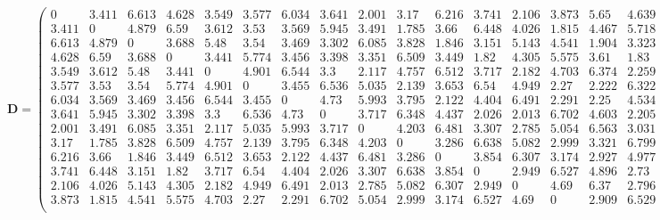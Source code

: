 \documentclass[11pt,oneside,czech,american]{book} %
\theoremstyle{definition} %
\theoremstyle{definition}
\begin{document}
\tiny
$$\bm{D}=\begin{pmatrix}
	0 & 3.411 & 6.613 & 4.628 & 3.549 & 3.577 & 6.034 & 3.641 & 2.001 & 3.17 & 6.216 & 3.741 & 2.106 & 3.873 & 5.65 & 4.639 & 3.327 & 2.033 & 5.169 & 5.541\\
	3.411 & 0 & 4.879 & 6.59 & 3.612 & 3.53 & 3.569 & 5.945 & 3.491 & 1.785 & 3.66 & 6.448 & 4.026 & 1.815 & 4.467 & 5.718 & 1.852 & 3.422 & 5.694 & 5.51\\
	6.613 & 4.879 & 0 & 3.688 & 5.48 & 3.54 & 3.469 & 3.302 & 6.085 & 3.828 & 1.846 & 3.151 & 5.143 & 4.541 & 1.904 & 3.323 & 5.456 & 5.653 & 3.653 & 1.867\\
	4.628 & 6.59 & 3.688 & 0 & 3.441 & 5.774 & 3.456 & 3.398 & 3.351 & 6.509 & 3.449 & 1.82 & 4.305 & 5.575 & 3.61 & 1.83 & 5.5 & 5.548 & 1.834 & 3.578\\
	3.549 & 3.612 & 5.48 & 3.441 & 0 & 4.901 & 6.544 & 3.3 & 2.117 & 4.757 & 6.512 & 3.717 & 2.182 & 4.703 & 6.374 & 2.259 & 2.334 & 3.094 & 4.528 & 4.838\\
	3.577 & 3.53 & 3.54 & 5.774 & 4.901 & 0 & 3.455 & 6.536 & 5.035 & 2.139 & 3.653 & 6.54 & 4.949 & 2.27 & 2.222 & 6.322 & 3.527 & 2.149 & 5.203 & 4.682\\
	6.034 & 3.569 & 3.469 & 3.456 & 6.544 & 3.455 & 0 & 4.73 & 5.993 & 3.795 & 2.122 & 4.404 & 6.491 & 2.291 & 2.25 & 4.534 & 4.717 & 5.091 & 2.188 & 3.5\\
	3.641 & 5.945 & 3.302 & 3.398 & 3.3 & 6.536 & 4.73 & 0 & 3.717 & 6.348 & 4.437 & 2.026 & 2.013 & 6.702 & 4.603 & 2.205 & 5.349 & 4.735 & 3.328 & 1.958\\
	2.001 & 3.491 & 6.085 & 3.351 & 2.117 & 5.035 & 5.993 & 3.717 & 0 & 4.203 & 6.481 & 3.307 & 2.785 & 5.054 & 6.563 & 3.031 & 3.088 & 3.565 & 3.805 & 5.021\\
	3.17 & 1.785 & 3.828 & 6.509 & 4.757 & 2.139 & 3.795 & 6.348 & 4.203 & 0 & 3.286 & 6.638 & 5.082 & 2.999 & 3.321 & 6.799 & 2.841 & 3.047 & 5.555 & 4.406\\
	6.216 & 3.66 & 1.846 & 3.449 & 6.512 & 3.653 & 2.122 & 4.437 & 6.481 & 3.286 & 0 & 3.854 & 6.307 & 3.174 & 2.927 & 4.977 & 4.191 & 5.364 & 3.14 & 3.006\\
	3.741 & 6.448 & 3.151 & 1.82 & 3.717 & 6.54 & 4.404 & 2.026 & 3.307 & 6.638 & 3.854 & 0 & 2.949 & 6.527 & 4.896 & 2.73 & 5.45 & 4.431 & 2.824 & 2.889\\
	2.106 & 4.026 & 5.143 & 4.305 & 2.182 & 4.949 & 6.491 & 2.013 & 2.785 & 5.082 & 6.307 & 2.949 & 0 & 4.69 & 6.37 & 2.796 & 3.621 & 3.031 & 4.611 & 3.952\\
	3.873 & 1.815 & 4.541 & 5.575 & 4.703 & 2.27 & 2.291 & 6.702 & 5.054 & 2.999 & 3.174 & 6.527 & 4.69 & 0 & 2.909 & 6.529 & 2.945 & 3.094 & 4.466 & 4.918\\

\end{pmatrix}$$
\end{document}
